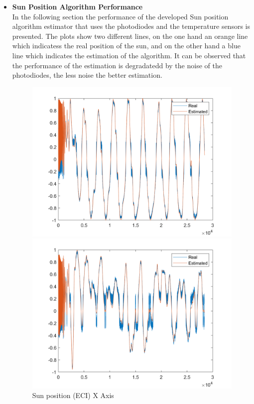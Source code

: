 \begin{itemize}
    \item \textbf{Sun Position Algorithm Performance }\\
    In the following section the performance of the developed Sun position algorithm estimator
    that uses the photodiodes and the temperature sensors is presented. The plots show two different lines, on the one hand
    an orange line which indicatess the real position of the sun, and on the other hand a blue line which
    indicates the estimation of the algorithm. It can be observed that the performance of the estimation is degradatedd
    by the noise of the photodiodes, the less noise the better estimation.
    \begin{figure}[H]
        \centering
        \begin{minipage}{0.32\linewidth}
            \centering
            \includegraphics[width=0.95\linewidth]{res/img/Nadir_no_EKF/Sun position (ECI) X Axis.png}
            \caption{Sun position (ECI) X Axis}
            \label{fig:SunPositionECIX}
        \end{minipage}\hfill
        \begin{minipage}{0.32\linewidth}
            \centering
            \includegraphics[width=0.95\linewidth]{res/img/Nadir_no_EKF/Sun position (ECI) Y Axis.png}

\end{minipage}
\end{figure}
\end{itemize}
